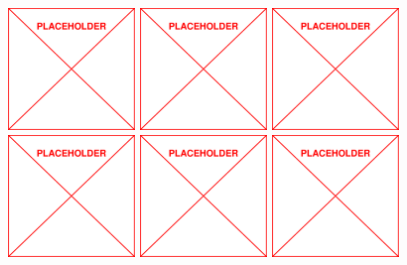 \begin{figure}
	\centering
	\includegraphics[width=0.30\textwidth]{figs/placeholder}
	\includegraphics[width=0.30\textwidth]{figs/placeholder}
	\includegraphics[width=0.30\textwidth]{figs/placeholder}
	\includegraphics[width=0.30\textwidth]{figs/placeholder}
	\includegraphics[width=0.30\textwidth]{figs/placeholder}
	\includegraphics[width=0.30\textwidth]{figs/placeholder}

\end{figure}
